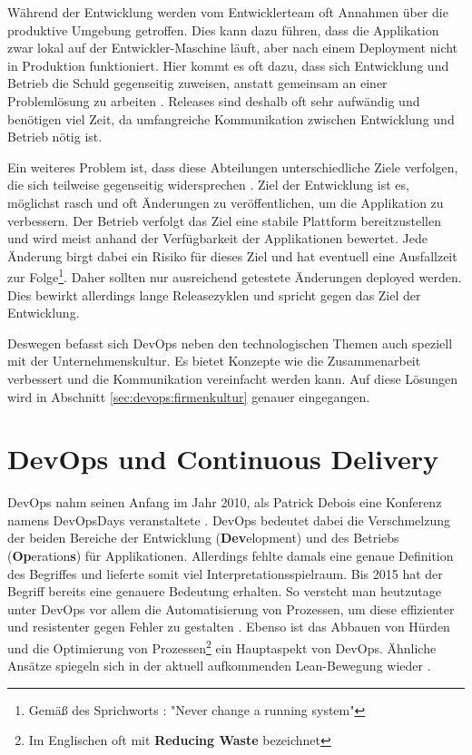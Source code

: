 Während der Entwicklung werden vom Entwicklerteam oft Annahmen über die produktive Umgebung getroffen. Dies kann dazu führen, dass die Applikation zwar lokal auf der Entwickler-Maschine läuft, aber nach einem Deployment nicht in Produktion funktioniert. Hier kommt es oft dazu, dass sich Entwicklung und Betrieb die Schuld gegenseitig zuweisen, anstatt gemeinsam an einer Problemlösung zu arbeiten \cite{peschlow2012}. Releases sind deshalb oft sehr aufwändig und benötigen viel Zeit, da umfangreiche Kommunikation zwischen Entwicklung und Betrieb nötig ist.

Ein weiteres Problem ist, dass diese Abteilungen unterschiedliche Ziele verfolgen, die sich teilweise gegenseitig widersprechen \cite{peschlow2012, brown2014}. Ziel der Entwicklung ist es, möglichst rasch und oft Änderungen zu veröffentlichen, um die Applikation zu verbessern. Der Betrieb verfolgt das Ziel eine stabile Plattform bereitzustellen und wird meist anhand der Verfügbarkeit der Applikationen bewertet. Jede Änderung birgt dabei ein Risiko für dieses Ziel und hat eventuell eine Ausfallzeit zur Folge\footnote{Gemäß des Sprichworts \cite{brown2014}: "Never change a running system"}. Daher sollten nur ausreichend getestete Änderungen deployed werden. Dies bewirkt allerdings lange Releasezyklen und spricht gegen das Ziel der Entwicklung.

Deswegen befasst sich DevOps neben den technologischen Themen auch speziell mit der Unternehmenskultur. Es bietet Konzepte wie die Zusammenarbeit verbessert und die Kommunikation vereinfacht werden kann. Auf diese Lösungen wird in Abschnitt \ref{sec:devops:firmenkultur} genauer eingegangen.

\section{DevOps und Continuous Delivery}
DevOps nahm seinen Anfang im Jahr 2010, als Patrick Debois eine Konferenz namens DevOpsDays veranstaltete \cite{peschlow2012}. DevOps bedeutet dabei die Verschmelzung der beiden Bereiche der Entwicklung (\textbf{Dev}elopment) und des Betriebs (\textbf{Op}eration\textbf{s}) für Applikationen. Allerdings fehlte damals eine genaue Definition des Begriffes und lieferte somit viel Interpretationsspielraum. Bis 2015 hat der Begriff bereits eine genauere Bedeutung erhalten. So versteht man heutzutage unter DevOps vor allem die Automatisierung von Prozessen, um diese effizienter und resistenter gegen Fehler zu gestalten \cite{peschlow2012, brown2014}. Ebenso ist das Abbauen von Hürden und die Optimierung von Prozessen\footnote{Im Englischen oft mit \textbf{Reducing Waste} bezeichnet} ein Hauptaspekt von DevOps. Ähnliche Ansätze spiegeln sich in der aktuell aufkommenden Lean-Bewegung wieder \cite{humble2014}.

